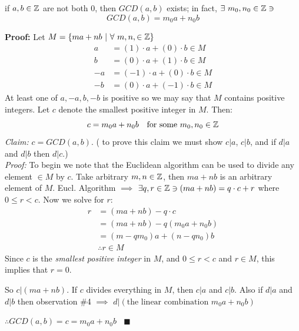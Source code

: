 \begin{lemma}
if $a,b\in {\mathbb{Z}}$ are not both $0$, then $GCD(a,b)$ exists; in fact, $\exists \ m_0,n_0\in {\mathbb{Z}} \ni $
\begin{equation}
    GCD(a,b)=m_0 a+n_0 b\nonumber
\end{equation}

\noindent\textbf{Proof:} Let $M= \{ma+nb \ | \ \forall \ m,n,\in {\mathbb{Z}} \}$
\begin{align}
a&=(1)\cdot a + (0)\cdot b \in M \nonumber \\
b&=(0)\cdot a + (1)\cdot b \in M\nonumber \\
-a&=(-1)\cdot a + (0)\cdot b \in M\nonumber \\
-b&=(0)\cdot a + (-1)\cdot b \in M\nonumber
\end{align}
At least one of $a,-a,b,-b$ is positive so we may say that $M$ contains positive integers. Let $c$
denote the smallest positive integer in $M$. Then:\\
\begin{equation}
    c=m_0 a +n_0 b \ \ \text{ for some } m_0,n_0\in {\mathbb{Z}} \nonumber
\end{equation}
\textit{Claim:} $c=GCD(a,b)$. ( to prove this claim we must show $c|a$, $c|b$, and if $d|a$ and
$d|b$ then $d|c$.)\\
\textit{Proof:} To begin we note that the Euclidean algorithm can be used to divide any element
$\in M$ by $c$. Take arbitrary $m,n \in {\mathbb{Z}}$, then $ma+nb$ is an arbitrary element of $M$. Eucl.
Algorithm $\implies$ $\exists q,r \in {\mathbb{Z}}\ni (ma+nb)=q\cdot c + r$ where $0\leq r < c$. Now we solve
for $r$:
\begin{align}
    r&= (ma+nb)-q\cdot c \nonumber\\
    &= (ma+nb)-q(m_0a +n_0 b) \nonumber\\
    &= (m-qm_0)a+(n- q n_0)b \nonumber\\
    &\therefore r\in M \nonumber
\end{align}
Since $c$ is the \textit{smallest positive integer} in $M$, and $0\leq r < c$ and $r\in M$, this
implies that $r=0$.\steezybreak

\noindent So $c|(ma+nb)$. If $c$ divides everything in $M$, then $c|a$ and $c|b$. Also if $d|a$ and
$d|b$ then observation \#4 $\implies$ $d|(\text{the linear combination } m_0a+n_0b)$\steezybreak

\noindent $\therefore GCD(a,b)=c=m_0a+n_0b \ \ \ \ \blacksquare$\steezybreak

\end{lemma}

